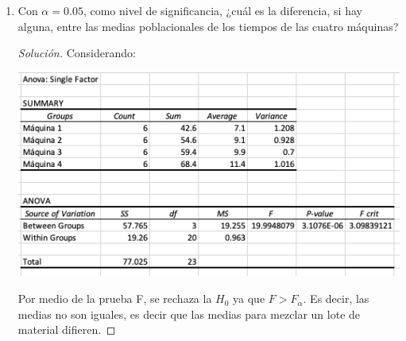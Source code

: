 \documentclass[a4paper,12pt]{article}
\newenvironment{solution}
  {\renewcommand\qedsymbol{$\blacksquare$}\begin{proof}[Solución]}
  {\end{proof}}
\begin{document}
\begin{enumerate}
    \item Con $\alpha =0.05$, como nivel de significancia, ¿cuál es la diferencia, si hay alguna, entre las medias poblacionales de los tiempos de las cuatro máquinas?
    \begin{solution}
    Considerando:
    \begin{center}
        \includegraphics[scale=0.7]{Imagenes/18.png}
    \end{center}
    Por medio de la prueba F, se rechaza la $H_0$ ya que $F>F_\alpha$. Es decir, las medias no son iguales, es decir que las medias para mezclar un lote de material difieren.
    \end{solution}
    

\end{enumerate}
\end{document}
